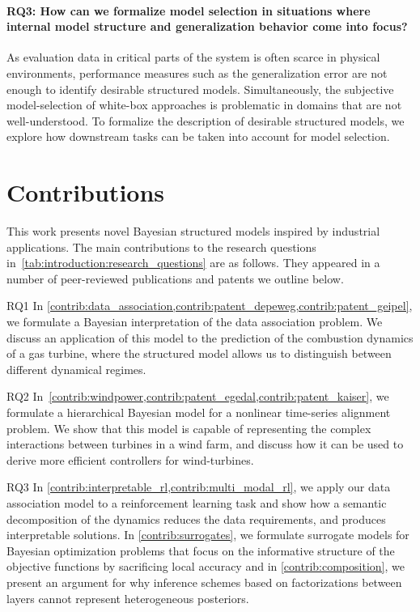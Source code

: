 \paragraph{RQ3: How can we formalize model selection in situations where internal model structure and generalization behavior come into focus?}
As evaluation data in critical parts of the system is often scarce in physical environments, performance measures such as the generalization error are not enough to identify desirable structured models.
Simultaneously, the subjective model-selection of white-box approaches is problematic in domains that are not well-understood.
To formalize the description of desirable structured models, we explore how downstream tasks can be taken into account for model selection.

\section{Contributions}
This work presents novel Bayesian structured models inspired by industrial applications.
The main contributions to the research questions in~\cref{tab:introduction:research_questions} are as follows.
They appeared in a number of peer-reviewed publications and patents we outline below.

\begin{compactdesc}
    \item[RQ1]
    In \cref{contrib:data_association,contrib:patent_depeweg,contrib:patent_geipel}, we formulate a Bayesian interpretation of the data association problem.
    We discuss an application of this model to the prediction of the combustion dynamics of a gas turbine, where the structured model allows us to distinguish between different dynamical regimes.
    \item[RQ2]
    In~\cref{contrib:windpower,contrib:patent_egedal,contrib:patent_kaiser}, we formulate a hierarchical Bayesian model for a nonlinear time-series alignment problem.
    We show that this model is capable of representing the complex interactions between turbines in a wind farm, and discuss how it can be used to derive more efficient controllers for wind-turbines.
    \item[RQ3]
    In \cref{contrib:interpretable_rl,contrib:multi_modal_rl}, we apply our data association model to a reinforcement learning task and show how a semantic decomposition of the dynamics reduces the data requirements, and produces interpretable solutions.
    In \cref{contrib:surrogates}, we formulate surrogate models for Bayesian optimization problems that focus on the informative structure of the objective functions by sacrificing local accuracy and in \cref{contrib:composition}, we present an argument for why inference schemes based on factorizations between layers cannot represent heterogeneous posteriors.
\end{compactdesc}


